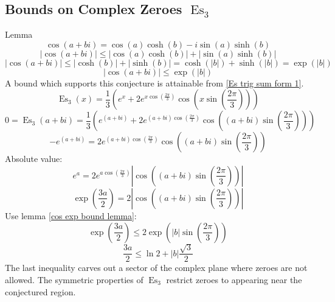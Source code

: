 \documentclass[]{article}
\DeclareMathOperator{\es}{Es}
\newcommand{\pqty}[1]{{\left(#1\right)}}
\newcommand{\abs}[1]{{\left\lvert#1\right\rvert}}
\begin{document}
	\subsection{Bounds on Complex Zeroes \(\es_3\)}
	Lemma
	\begin{equation}
	\cos\pqty{a+bi}=\cos\pqty{a}\cosh\pqty{b}-i\sin\pqty{a}\sinh\pqty{b}
	\end{equation}
	\begin{equation}
	\abs{\cos\pqty{a+bi}} \leq \abs{\cos\pqty{a}\cosh\pqty{b}}+\abs{\sin\pqty{a}\sinh\pqty{b}}
	\end{equation}
	\begin{equation}
	\abs{\cos\pqty{a+bi}} \leq \abs{\cosh\pqty{b}}+\abs{\sinh\pqty{b}}
	= \cosh\pqty{\abs{b}}+{\sinh\pqty{\abs{b}}} = \exp\pqty{\abs{b}}
	\end{equation}
	\begin{equation}
	\label{cos exp bound lemma}
	\abs{\cos\pqty{a+bi}} \leq \exp\pqty{\abs{b}}
	\end{equation}
	A bound which supports this conjecture is attainable from \eqref{Es trig sum form 1}.
	\begin{equation}
	\es_3\pqty{x}=
	\frac{1}{3}\pqty{
		e^x
		+2e^{x\cos\pqty{\frac{2\pi}{3}}} \cos\pqty{x\sin\pqty{\frac{2\pi}{3}}}
	}
	\end{equation}
	\begin{equation}
	0=\es_3\pqty{a+bi}=
	\frac{1}{3}\pqty{
		e^\pqty{a+bi}
		+2e^{\pqty{a+bi}\cos\pqty{\frac{2\pi}{3}}} \cos\pqty{\pqty{a+bi}\sin\pqty{\frac{2\pi}{3}}}
	}
	\end{equation}
	\begin{equation}
	-e^\pqty{a+bi}=
	2e^{\pqty{a+bi}\cos\pqty{\frac{2\pi}{3}}} \cos\pqty{\pqty{a+bi}\sin\pqty{\frac{2\pi}{3}}}
	\end{equation}
	Absolute value:
	\begin{equation}
	e^{a}=
	2e^{{a}\cos\pqty{\frac{2\pi}{3}}} \abs{\cos\pqty{\pqty{a+bi}\sin\pqty{\frac{2\pi}{3}}}}
	\end{equation}
	\begin{equation}
	\exp\pqty{\frac{3a}{2}}=
	2 \abs{\cos\pqty{\pqty{a+bi}\sin\pqty{\frac{2\pi}{3}}}}
	\end{equation}
	Use lemma \eqref{cos exp bound lemma}:
	\begin{equation}
	\exp\pqty{\frac{3a}{2}} \leq
	2 {\exp\pqty{\abs{b}\sin\pqty{\frac{2\pi}{3}}}}
	\end{equation}
	\begin{equation}
	{\frac{3a}{2}} \leq
	\ln{2}+ {\abs{b}\frac{\sqrt{3}}{2}}
	\end{equation}
	The last inequality carves out a sector of the complex plane where zeroes are not allowed. The symmetric properties of \(\es_3\) restrict zeroes to appearing near the conjectured region.
	
\end{document}
